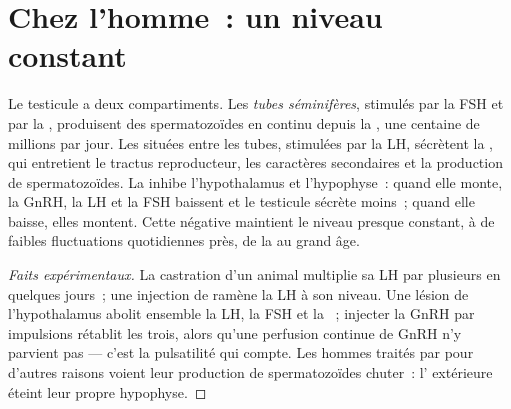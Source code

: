 \section{Chez l'homme~: un niveau constant}

\begin{proposition}\label{prop:g11:hormones-and-reproduction:male}
Le testicule a deux compartiments. Les \emph{tubes séminifères},
stimulés par la FSH et par la , produisent des
spermatozoïdes en continu depuis la , une centaine de millions
par jour. Les  situées entre les tubes, stimulées par la LH,
sécrètent la \emph{}, qui entretient le tractus
reproducteur, les caractères secondaires et la production de
spermatozoïdes. La  inhibe l'hypothalamus et l'hypophyse~:
quand elle monte, la GnRH, la LH et la FSH baissent et le testicule
sécrète moins~; quand elle baisse, elles montent. Cette 
négative maintient le niveau presque constant, à de faibles
fluctuations quotidiennes près, de la  au grand âge.
\end{proposition}
\begin{proof}[Faits expérimentaux]
La castration d'un animal multiplie sa LH par plusieurs en quelques
jours~; une injection de  ramène la LH à son niveau. Une
lésion de l'hypothalamus abolit ensemble la LH, la FSH et la
~; injecter la GnRH par impulsions rétablit les trois,
alors qu'une perfusion continue de GnRH n'y parvient pas --- c'est la
pulsatilité qui compte. Les hommes traités par  pour
d'autres raisons voient leur production de spermatozoïdes chuter~:
l' extérieure éteint leur propre hypophyse.
\end{proof}

